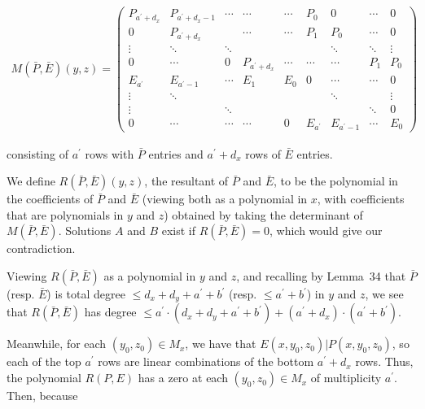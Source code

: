 \[\begin{gathered}
M(\bar{P},\bar{E})(y,z)=\begin{pmatrix}P_{a^{\prime}+d_{x}}&P_{a^{\prime}+d_{x}-1}&\cdots&\cdots&\cdots&P_{0}&0&\cdots&0\\
0&P_{a^{\prime}+d_{x}}&&\cdots&\cdots&P_{1}&P_{0}&\cdots&0\\
\vdots&\ddots&\ddots&&&&\ddots&\ddots&\vdots\\
0&\cdots&0&P_{a^{\prime}+d_{x}}&\cdots&\cdots&\cdots&P_{1}&P_{0}\\
E_{a^{\prime}}&E_{a^{\prime}-1}&\cdots&E_{1}&E_{0}&0&\cdots&\cdots&0\\
\vdots&\ddots&&&&&\ddots&&\vdots\\
\vdots&&\ddots&&&&&\ddots&0\\
0&\cdots&\cdots&\cdots&0&E_{a^{\prime}}&E_{a^{\prime}-1}&\cdots&E_{0}\end{pmatrix}
\end{gathered}\]


consisting of $a^{\prime}$ rows with $\bar{P}$ entries and $a^{\prime}+d_{x}$ rows of $\bar{E}$ entries.\par




We define $R(\bar{P},\bar{E})(y,z)$, the resultant of $\bar{P}$ and $\bar{E}$, to be the polynomial in the coefficients of $\bar{P}$ and $\bar{E}$ (viewing both as a polynomial in $x$, with coefficients that are polynomials in $y$ and $z$) obtained by taking the determinant of $M(\bar{P},\bar{E})$. Solutions $A$ and $B$ exist if $R(\bar{P},\bar{E})=0$, which would give our contradiction.\par




Viewing $R(\bar{P},\bar{E})$ as a polynomial in $y$ and $z$, and recalling by Lemma 34 that $\bar{P}$ (resp. $\bar{E}$) is total degree $\leq d_{x}+d_{y}+a^{\prime}+b^{\prime}$ (resp. $\leq a^{\prime}+b^{\prime}$) in $y$ and $z$, we see that $R(\bar{P},\bar{E})$ has degree $\leq a^{\prime}\cdot(d_{x}+d_{y}+a^{\prime}+b^{\prime})+(a^{\prime}+d_{x})\cdot(a^{\prime}+b^{\prime})$.\par




Meanwhile, for each $(y_{0},z_{0})\in M_{x}$, we have that $E(x,y_{0},z_{0})|P(x,y_{0},z_{0})$, so each of the top $a^{\prime}$ rows are linear combinations of the bottom $a^{\prime}+d_{x}$ rows. Thus, the polynomial $R(P,E)$ has a zero at each $(y_{0},z_{0})\in M_{x}$ of multiplicity $a^{\prime}$. Then, because\par


